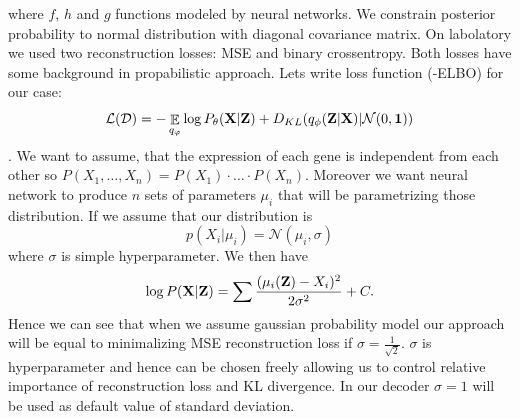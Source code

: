 \documentclass[12pt,a4paper]{article}
\DeclareMathOperator{\EX}{\mathbb{E}}%
\begin{document}
where $f$, $h$ and $g$ functions modeled by neural networks. We constrain posterior probability to normal distribution with diagonal covariance matrix.
On labolatory we used two reconstruction losses: MSE and binary crossentropy. Both losses have some background in propabilistic approach. Lets write loss function
(-ELBO) for our case:
\begin{equation}
    \mathcal{L}(\mathcal{D})=-\EX_{q_\varphi}\log{ P_\theta(\vb{X}|\vb{Z})}+D_{KL}(q_\phi(\vb{Z}|\vb{X})|\mathcal{N}(0,\vb{1}))
\end{equation}. We want to assume, that the expression of each gene is independent from each other so 
$P(X_1,\ldots,X_n)=P(X_1)\cdot\ldots \cdot P(X_n)$.
Moreover we want neural network to produce $n$ sets of parameters $\mu_i$ that will be parametrizing those distribution. If we assume that our 
distribution is 
\begin{equation}
    p(X_i|\mu_i)=\mathcal{N}(\mu_i,\sigma)
\end{equation}
where $\sigma$ is simple hyperparameter. We then have 
\begin{equation}
    \log{P(\vb{X}|\vb{Z})}=\sum \frac{(\mu_i(\vb{Z})-X_i)^2}{2\sigma^2}+C.
\end{equation} Hence we can see that when we assume gaussian probability model our approach will be equal to minimalizing MSE reconstruction loss if 
$\sigma=\frac{1}{\sqrt{2}}$. $\sigma$ is hyperparameter and hence can be chosen freely allowing us to control relative importance of reconstruction loss
and KL divergence. In our decoder $\sigma=1$ will be used as default value of standard deviation.
\end{document}
